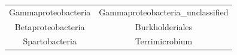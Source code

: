 \documentclass[]{article}
\begin{document}
\begin{longtable}[]{@{}cc@{}}
\begin{minipage}[t]{0.38\columnwidth}\centering\strut
Gammaproteobacteria\strut
\end{minipage} & \begin{minipage}[t]{0.44\columnwidth}\centering\strut
Gammaproteobacteria\_unclassified\strut
\end{minipage}\tabularnewline
\begin{minipage}[t]{0.38\columnwidth}\centering\strut
Betaproteobacteria\strut
\end{minipage} & \begin{minipage}[t]{0.44\columnwidth}\centering\strut
Burkholderiales\strut
\end{minipage}\tabularnewline
\begin{minipage}[t]{0.38\columnwidth}\centering\strut
Spartobacteria\strut
\end{minipage} & \begin{minipage}[t]{0.44\columnwidth}\centering\strut
Terrimicrobium\strut
\end{minipage}\tabularnewline
\bottomrule
\end{longtable}
\end{document}
